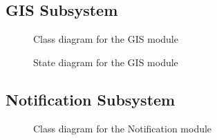 \documentclass{article}
\begin{document}
		\subsection{GIS Subsystem}
		
			\begin{figure}[H]
				
				\caption{Class diagram for the GIS module}
				
			\end{figure}
			
			\begin{figure}[H]
				
				\caption{State diagram for the GIS module}
				
			\end{figure}

		\subsection{Notification Subsystem}
			
			\begin{figure}[H]
				
				\caption{Class diagram for the Notification module}
				
			\end{figure}
			
\end{document}
